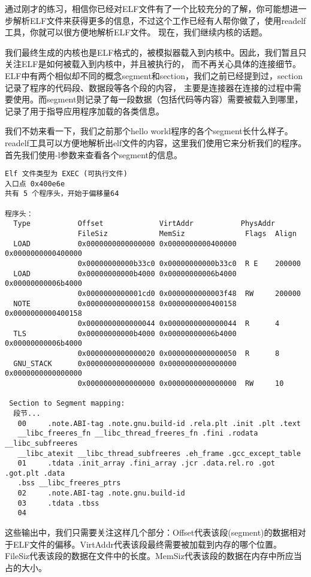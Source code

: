 通过刚才的练习，相信你已经对ELF文件有了一个比较充分的了解，你可能想进一步解析ELF文件来获得更多的信息，不过这个工作已经有人帮你做了，使用readelf工具，你就可以很方便地解析ELF文件。
现在，我们继续内核的话题。

我们最终生成的内核也是ELF格式的，被模拟器载入到内核中。因此，我们暂且只关注ELF是如何被载入到内核中，并且被执行的，
而不再关心具体的连接细节。ELF中有两个相似却不同的概念segment和section，我们之前已经提到过，section记录了程序的代码段、数据段等各个段的内容，
主要是连接器在连接的过程中需要使用。而segment则记录了每一段数据（包括代码等内容）需要被载入到哪里，记录了用于指导应用程序加载的各类信息。

我们不妨来看一下，我们之前那个hello world程序的各个segment长什么样子。readelf工具可以方便地解析出elf文件的内容，这里我们使用它来分析我们的程序。
首先我们使用-l参数来查看各个segment的信息。

\begin{verbatim}
Elf 文件类型为 EXEC (可执行文件)
入口点 0x400e6e
共有 5 个程序头，开始于偏移量64

程序头：
  Type           Offset             VirtAddr           PhysAddr
                 FileSiz            MemSiz              Flags  Align
  LOAD           0x0000000000000000 0x0000000000400000 0x0000000000400000
                 0x00000000000b33c0 0x00000000000b33c0  R E    200000
  LOAD           0x00000000000b4000 0x00000000006b4000 0x00000000006b4000
                 0x0000000000001cd0 0x0000000000003f48  RW     200000
  NOTE           0x0000000000000158 0x0000000000400158 0x0000000000400158
                 0x0000000000000044 0x0000000000000044  R      4
  TLS            0x00000000000b4000 0x00000000006b4000 0x00000000006b4000
                 0x0000000000000020 0x0000000000000050  R      8
  GNU_STACK      0x0000000000000000 0x0000000000000000 0x0000000000000000
                 0x0000000000000000 0x0000000000000000  RW     10

 Section to Segment mapping:
  段节...
   00     .note.ABI-tag .note.gnu.build-id .rela.plt .init .plt .text 
   __libc_freeres_fn __libc_thread_freeres_fn .fini .rodata __libc_subfreeres 
   __libc_atexit __libc_thread_subfreeres .eh_frame .gcc_except_table 
   01     .tdata .init_array .fini_array .jcr .data.rel.ro .got .got.plt .data 
   .bss __libc_freeres_ptrs 
   02     .note.ABI-tag .note.gnu.build-id 
   03     .tdata .tbss 
   04
\end{verbatim}

这些输出中，我们只需要关注这样几个部分：Offset代表该段(segment)的数据相对于ELF文件的偏移。VirtAddr代表该段最终需要被加载到内存的哪个位置。
FileSiz代表该段的数据在文件中的长度。MemSiz代表该段的数据在内存中所应当占的大小。

